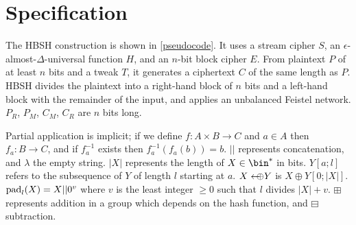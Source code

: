 \documentclass[eprint.tex]{subfiles}
\begin{document}
\section{Specification}
The HBSH construction is shown in \autoref{pseudocode}. It uses a stream cipher $S$, an
$\epsilon$-almost-$\Delta$-universal function $H$, and an $n$-bit block cipher $E$.
From plaintext $P$ of at least $n$ bits and a tweak $T$,
it generates a ciphertext $C$ of the same length as $P$.
HBSH divides the plaintext into a right-hand block of $n$ bits and a left-hand block with
the remainder of the input, and applies an unbalanced Feistel network.
$P_R$, $P_M$, $C_M$, $C_R$ are $n$ bits long.

\begin{figure}
    \begin{floatrow}
    \end{floatrow}
\end{figure}

Partial application is implicit; if we define $f: A \times B \rightarrow C$ and
$a \in A$ then $f_a: B \rightarrow C$, and if $f_a^{-1}$ exists then $f_a^{-1}(f_a(b)) = b$.
$||$ represents concatenation, and $\lambda$ the empty string.
$|X|$ represents the length of $X \in \bin^{*}$ in bits.
$Y[a;l]$ refers to the subsequence of $Y$ of length $l$ starting at $a$.
$X \leftarrow\mkern-12mu\oplus Y$ is $X \oplus Y[0;|X|]$.
$\operatorname{pad}_l(X) = X||0^v$ where $v$ is the least integer $\geq 0$ such that $l$ divides $|X| + v$.
$\boxplus$ represents addition in a group which depends
on the hash function, and $\boxminus$ subtraction.
\end{document}
